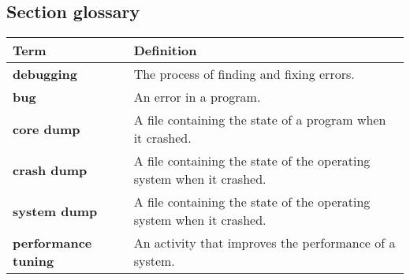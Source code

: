 \subsection*{Section glossary}

\begin{tabular}{>{\raggedright}p{} >{\raggedright\arraybackslash}p{}}
\toprule
\textbf{Term} & \textbf{Definition} \\
\midrule
\textbf{debugging} & The process of finding and fixing errors. \\
\textbf{bug} & An error in a program. \\
\textbf{core dump} & A file containing the state of a program when it crashed. \\
\textbf{crash dump} & A file containing the state of the operating system when it crashed. \\
\textbf{system dump} & A file containing the state of the operating system when it crashed. \\
\textbf{performance tuning} & An activity that improves the performance of a system. \\
\bottomrule
\end{tabular}
\vspace{\baselineskip}
